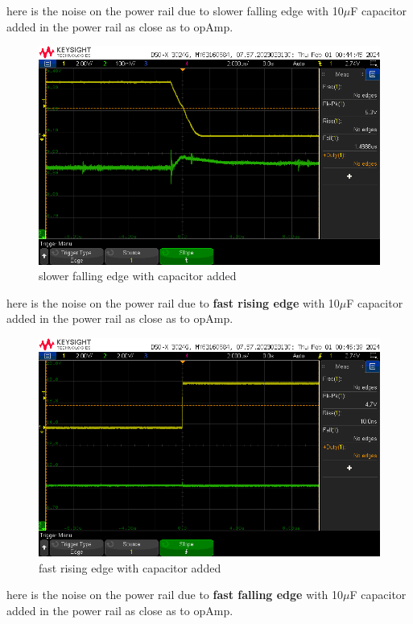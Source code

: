 \documentclass[a4paper,11pt]{article}%
\begin{document}
		here is the noise on the power rail due to slower falling edge with 10$\mu$F capacitor added in the power rail as close as to opAmp.

		\begin{figure}[H]
			\centering
			\includegraphics[scale=0.6]{figures/fall_slow_cap.png}
			\caption{slower falling edge with capacitor added}
		\end{figure}

		\pagebreak
		here is the noise on the power rail due to \textbf{fast rising edge} with 10$\mu$F capacitor added in the power rail as close as to opAmp.

		\begin{figure}[H]
			\centering
			\includegraphics[scale=0.6]{figures/fast_rise_cap.png}
			\caption{fast rising edge with capacitor added}
		\end{figure}

		here is the noise on the power rail due to \textbf{fast falling edge} with 10$\mu$F capacitor added in the power rail as close as to opAmp.
\end{document}
